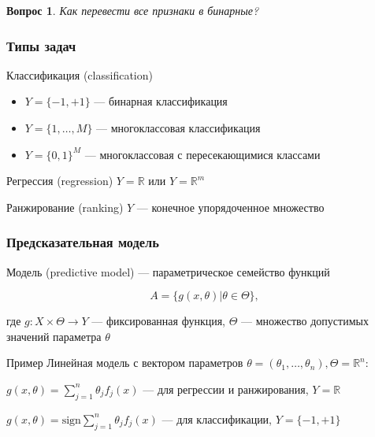 \documentclass[fullscreen=true, bookmarks=true, hyperref={pdfencoding=unicode}]{beamer}
\newtheorem*{question}{Вопрос}
\begin{document}
\begin{frame}
  \begin{question}
    Как перевести все признаки в бинарные?
  \end{question}

\end{frame}


\begin{frame}
  \frametitle{Типы задач}

  \begin{block}{Классификация (classification)}
    \begin{itemize}
      \item $Y = \{-1, +1\}$ — бинарная классификация
      \item $Y = \{1, \dots, M\}$ —  многоклассовая классификация
      \item $Y = \{0, 1\}^M$ —  многоклассовая с пересекающимися классами
    \end{itemize}
  \end{block}


  \begin{block}{Регрессия (regression)}
    $Y = \mathbb{R}$ или $Y = \mathbb{R}^m$
  \end{block}

  \begin{block}{Ранжирование (ranking)}
    $Y$ — конечное упорядоченное множество
  \end{block}
\end{frame}


\begin{frame}
  \frametitle{Предсказательная модель}

  Модель (predictive model) — параметрическое семейство функций

  $$A = \{g(x, \theta) | \theta \in \Theta\},$$

  где $g: X \times \Theta \to Y$ — фиксированная функция, $\Theta$ — множество допустимых значений параметра $\theta$

  \begin{block}{Пример}
    Линейная модель с вектором параметров $\theta = (\theta_1, \dots, \theta_n), \Theta = \mathbb{R}^n$:

    $g(x, \theta) = \sum\limits_{j=1}^n \theta_jf_j(x)$ — для регрессии и ранжирования, $Y = \mathbb{R}$

    $g(x, \theta) = \mathrm{sign}\sum\limits_{j=1}^n \theta_jf_j(x)$ — для классификации, $Y = \{-1, +1\}$
  \end{block}
\end{frame}
\end{document}
